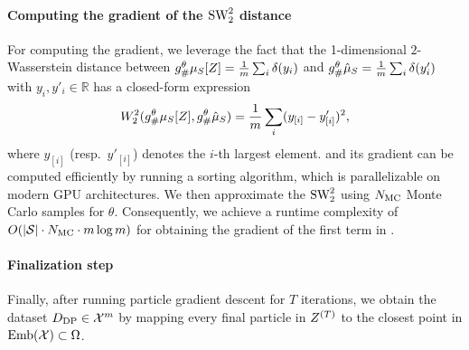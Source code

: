\paragraph{Computing the gradient of the $\text{SW}_2^2$ distance} 
For computing the gradient, we leverage the
fact that the 1-dimensional $2$-Wasserstein distance between $g^\theta_{\#}\mu_{S}[Z]= \frac{1}{m} \sum_i \delta(y_i)$ and $g^\theta_{\#} \hat \mu_{S} = \frac{1}{m} \sum_i \delta(y'_i)$ with $y_i, y'_i \in \mathbb R$ has a closed-form expression
\begin{equation}
\label{eq:wasserstein_simple}
     W_2^2(g^\theta_{\#}\mu_{S}[Z],g^\theta_{\#} \hat \mu_{S})  = \frac{1}{m} \sum_i (y_{[i]}- y'_{[i]})^2,  
\end{equation}
where $y_{[i]}$ (resp.~$y'_{[i]}$) denotes the $i$-th largest element. 
 and its gradient can be computed efficiently by running a sorting algorithm, which is parallelizable on modern GPU architectures. We then approximate the $\text{SW}_2^2$ using $N_{\text{MC}}$ Monte Carlo samples for $\theta$. Consequently, we achieve a runtime complexity of $O(\vert \mathcal S \vert \cdot N_{\text{MC}} \cdot m \log m)$ for obtaining the gradient of the first term in .

\paragraph{Finalization step} Finally, after running particle gradient descent for $T$ iterations, we obtain the dataset $D_{\text{DP}} \in \mathcal X^m$ by mapping every final particle in $Z^{(T)}$ to the closest point in $\text{Emb}(\mathcal X) \subset \Omega$. 


